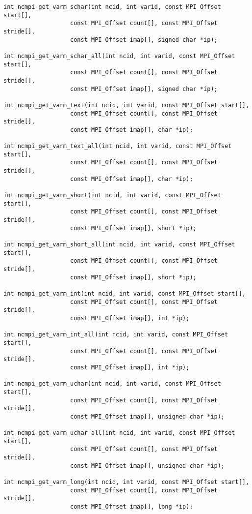 \begin{verbatim}
int ncmpi_get_varm_schar(int ncid, int varid, const MPI_Offset start[],
                   const MPI_Offset count[], const MPI_Offset stride[],
                   const MPI_Offset imap[], signed char *ip);

int ncmpi_get_varm_schar_all(int ncid, int varid, const MPI_Offset start[],
                   const MPI_Offset count[], const MPI_Offset stride[],
                   const MPI_Offset imap[], signed char *ip);

int ncmpi_get_varm_text(int ncid, int varid, const MPI_Offset start[],
                   const MPI_Offset count[], const MPI_Offset stride[],
                   const MPI_Offset imap[], char *ip);

int ncmpi_get_varm_text_all(int ncid, int varid, const MPI_Offset start[],
                   const MPI_Offset count[], const MPI_Offset stride[],
                   const MPI_Offset imap[], char *ip);

int ncmpi_get_varm_short(int ncid, int varid, const MPI_Offset start[],
                   const MPI_Offset count[], const MPI_Offset stride[],
                   const MPI_Offset imap[], short *ip);

int ncmpi_get_varm_short_all(int ncid, int varid, const MPI_Offset start[],
                   const MPI_Offset count[], const MPI_Offset stride[],
                   const MPI_Offset imap[], short *ip);

int ncmpi_get_varm_int(int ncid, int varid, const MPI_Offset start[],
                   const MPI_Offset count[], const MPI_Offset stride[],
                   const MPI_Offset imap[], int *ip);

int ncmpi_get_varm_int_all(int ncid, int varid, const MPI_Offset start[],
                   const MPI_Offset count[], const MPI_Offset stride[],
                   const MPI_Offset imap[], int *ip);

int ncmpi_get_varm_uchar(int ncid, int varid, const MPI_Offset start[],
                   const MPI_Offset count[], const MPI_Offset stride[],
                   const MPI_Offset imap[], unsigned char *ip);

int ncmpi_get_varm_uchar_all(int ncid, int varid, const MPI_Offset start[],
                   const MPI_Offset count[], const MPI_Offset stride[],
                   const MPI_Offset imap[], unsigned char *ip);

int ncmpi_get_varm_long(int ncid, int varid, const MPI_Offset start[],
                   const MPI_Offset count[], const MPI_Offset stride[],
                   const MPI_Offset imap[], long *ip);


\end{verbatim}
